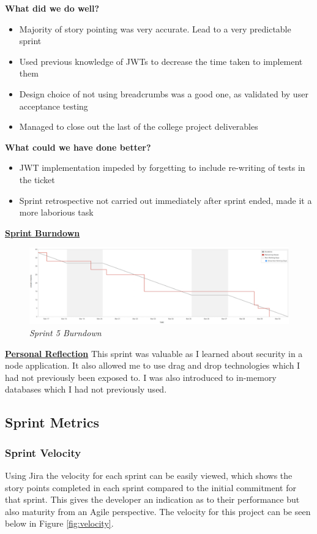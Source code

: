 \textbf{What did we do well?}
\begin{itemize}
	\item Majority of story pointing was very accurate. Lead to a very predictable sprint
	\item Used previous knowledge of JWTs to decrease the time taken to implement them
	\item Design choice of not using breadcrumbs was a good one, as validated by user acceptance testing
	\item Managed to close out the last of the college project deliverables
\end{itemize}
\textbf{What could we have done better?}
\begin{itemize}
	\item JWT implementation impeded by forgetting to include re-writing of tests in the ticket
	\item Sprint retrospective not carried out immediately after sprint ended, made it a more laborious task
\end{itemize}

\underline{\textbf{Sprint Burndown}}\newline
\begin{figure}[!ht]
\centering
\includegraphics*[width=\textwidth]{images/sprint5}
\caption{\em Sprint 5 Burndown}
\label{fig:sprint5}
\end{figure}

\underline{\textbf{Personal Reflection}}\newline
This sprint was valuable as I learned about security in a node application. It also allowed me to use drag and drop technologies which I had not previously been exposed to. I was also introduced to in-memory databases which I had not previously used.

\subsection{Sprint Metrics}

\subsubsection{Sprint Velocity}
Using Jira the velocity for each sprint can be easily viewed, which shows the story points completed in each sprint compared to the initial commitment for that sprint. This gives the developer an indication as to their performance but also maturity from an Agile perspective. The velocity for this project can be seen below in Figure \ref{fig:velocity}.

